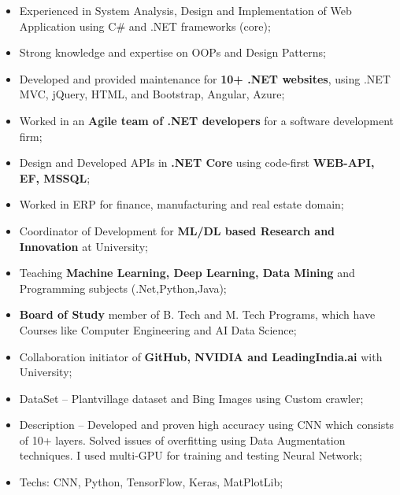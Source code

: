 \documentclass[10pt,a4paper]{altacv}
\begin{document}
\begin{itemize}
	\item Experienced in System Analysis, Design and Implementation of Web Application using C\# and .NET frameworks (core);
	\item Strong knowledge and expertise on OOPs and Design Patterns;
	\item Developed and provided maintenance for \textbf{10+ .NET websites}, using .NET MVC, jQuery, HTML, and Bootstrap, Angular, Azure;
	\item Worked in an \textbf{Agile team of .NET developers} for a software development firm;
	\item Design and Developed APIs in \textbf{.NET Core} using code-first \textbf{WEB-API, EF, MSSQL};
	\item Worked in ERP for finance, manufacturing and real estate domain;
\end{itemize}

\divider
%

\begin{itemize}
  \item Coordinator of Development for \textbf{ML/DL based Research and Innovation} at University;   
  \item Teaching \textbf{Machine Learning, Deep Learning, Data Mining} and Programming subjects (.Net,Python,Java);
  \item \textbf{Board of Study} member of B. Tech and M. Tech Programs, which have Courses like Computer Engineering and AI Data Science;  
  \item Collaboration initiator of \textbf{GitHub, NVIDIA and LeadingIndia.ai} with University;
 \end{itemize}

\medskip
\clearpage

\begin{itemize}
  \item DataSet -- Plantvillage dataset and Bing Images using Custom crawler;
  \item Description -- Developed and proven high accuracy using CNN which consists of 10+ layers. Solved issues of overfitting using Data Augmentation techniques. I used multi-GPU for training and testing Neural Network;
  \item Techs: CNN, Python, TensorFlow, Keras, MatPlotLib;
\end{itemize}
\end{document}
